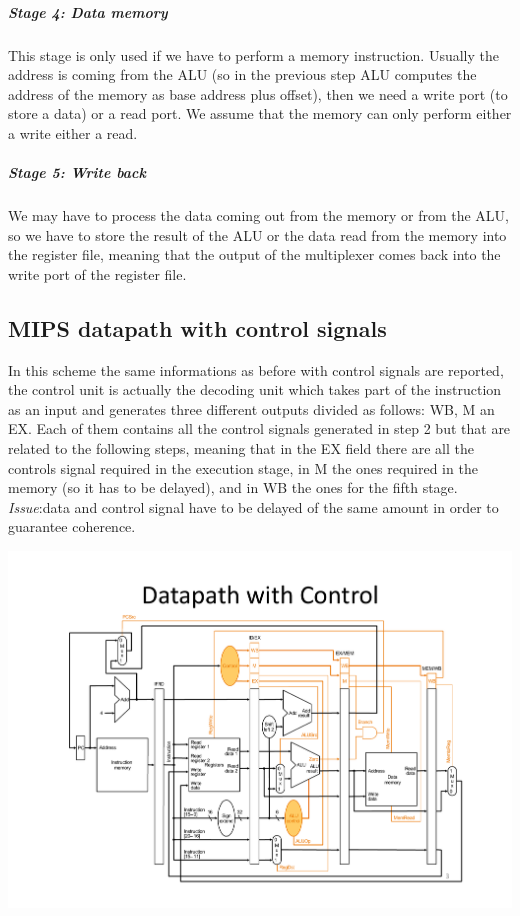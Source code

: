 \subparagraph{Stage 4: Data memory}
This stage is only used if we have to perform a memory instruction. Usually the address is coming from the ALU (so in the previous step ALU computes the address of the memory as base address plus offset), then we need a write port (to store a data) or a read port. We assume that the memory can only perform either a write either a read.

\subparagraph{Stage 5: Write back}
We may have to process the data coming out from the memory or from the ALU, so we have to store the result of the ALU or the data read from the memory into the register file, meaning that the output of the multiplexer comes back into the write port of the register file.

\subsection{MIPS datapath with control signals}
In this scheme the same informations as before with control signals are reported, the control unit is actually the decoding unit which takes part of the instruction as an input and generates three different outputs divided as follows: WB, M an EX. Each of them contains all the control signals generated in step 2 but that are related to the following steps, meaning that in the EX field there are all the controls signal required in the execution stage, in M the ones required in the memory (so it has to be delayed), and in WB  the ones for the fifth stage.\\

\textit{Issue}:data and control signal have to be delayed of the same amount in order to guarantee coherence.

\begin{center}
  \includegraphics[width=1.1\linewidth]{img/img3/mips2}
\end{center}

